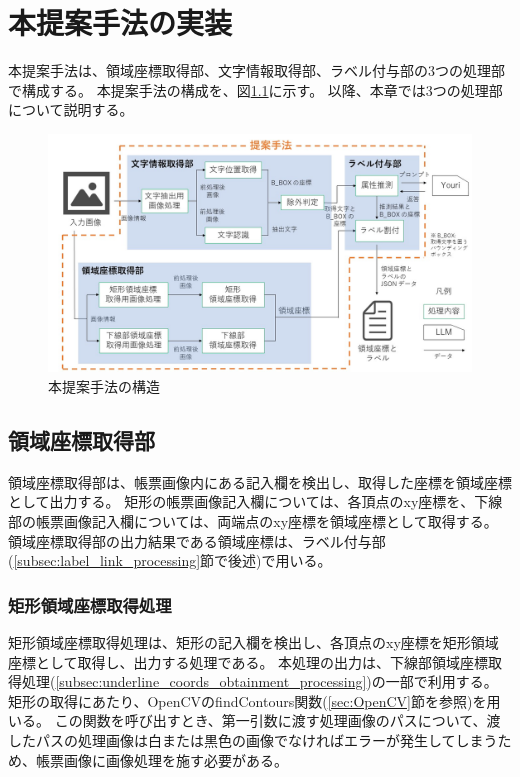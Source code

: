 \chapter{本提案手法の実装}\label{cha:Implementation}
本提案手法は、領域座標取得部、文字情報取得部、ラベル付与部の3つの処理部で構成する。
本提案手法の構成を、図\ref{fig:structure}に示す。
以降、本章では3つの処理部について説明する。

\begin{figure}[t]
    \begin{center}
        \includegraphics[width=15cm]{image/structure.jpg}
        \caption{本提案手法の構造}
        \label{fig:structure}
    \end{center}
\end{figure}


\section{領域座標取得部}\label{sec:area_coords_obtainment_part}
領域座標取得部は、帳票画像内にある記入欄を検出し、取得した座標を領域座標として出力する。
矩形の帳票画像記入欄については、各頂点のxy座標を、下線部の帳票画像記入欄については、両端点のxy座標を領域座標として取得する。
領域座標取得部の出力結果である領域座標は、ラベル付与部(\ref{subsec:label_link_processing}節で後述)で用いる。


\subsection{矩形領域座標取得処理}\label{subsec:rect_coords_obtainment_processing}
矩形領域座標取得処理は、矩形の記入欄を検出し、各頂点のxy座標を矩形領域座標として取得し、出力する処理である。
本処理の出力は、下線部領域座標取得処理(\ref{subsec:underline_coords_obtainment_processing})の一部で利用する。
矩形の取得にあたり、OpenCVのfindContours関数(\ref{sec:OpenCV}節を参照)を用いる。
この関数を呼び出すとき、第一引数に渡す処理画像のパスについて、渡したパスの処理画像は白または黒色の画像でなければエラーが発生してしまうため、帳票画像に画像処理を施す必要がある。

